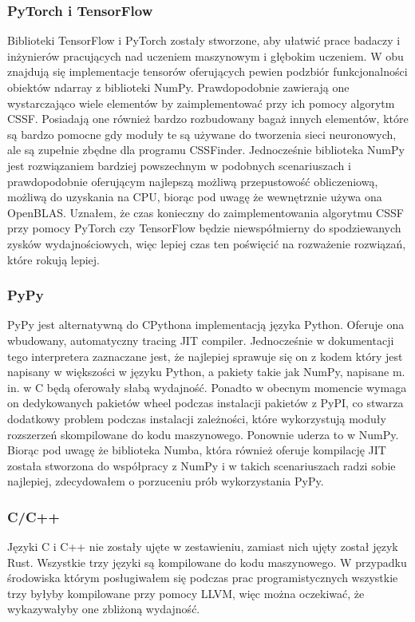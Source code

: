 \documentclass[11pt, a4paper]{article}
\begin{document}
\begin{sloppypar}
    \subsubsection{PyTorch i TensorFlow}
    Biblioteki TensorFlow i PyTorch zostały stworzone, aby ułatwić prace badaczy i inżynierów
    pracujących nad uczeniem maszynowym i głębokim uczeniem. W obu znajdują się
    implementacje tensorów oferujących pewien podzbiór funkcjonalności obiektów ndarray
    z biblioteki NumPy. Prawdopodobnie zawierają one wystarczająco wiele elementów by zaimplementować
    przy ich pomocy algorytm CSSF. Posiadają one również bardzo rozbudowany bagaż innych
    elementów, które są bardzo pomocne gdy moduły te są używane do tworzenia sieci neuronowych,
    ale są zupełnie zbędne dla programu CSSFinder. Jednocześnie biblioteka NumPy jest rozwiązaniem
    bardziej powszechnym w podobnych scenariuszach i prawdopodobnie oferującym najlepszą
    możliwą przepustowość obliczeniową, możliwą do uzyskania na CPU, biorąc pod uwagę że
    wewnętrznie używa ona OpenBLAS. Uznałem, że czas konieczny do zaimplementowania algorytmu
    CSSF przy pomocy PyTorch czy TensorFlow będzie niewspółmierny do spodziewanych zysków
    wydajnościowych, więc lepiej czas ten poświęcić na rozważenie rozwiązań, które rokują
    lepiej.

    \subsubsection{PyPy}
    PyPy jest alternatywną do CPythona implementacją języka Python. Oferuje ona
    wbudowany, automatyczny tracing JIT compiler. Jednocześnie w dokumentacji tego
    interpretera zaznaczane jest, że najlepiej sprawuje się on z kodem który jest napisany
    w większości w języku Python, a pakiety takie jak NumPy, napisane m. in. w C będą oferowały
    słabą wydajność\cite{PyPyPerformance}. Ponadto w obecnym momencie wymaga on dedykowanych
    pakietów wheel podczas instalacji pakietów z PyPI, co stwarza dodatkowy problem
    podczas instalacji zależności, które wykorzystują moduły rozszerzeń skompilowane do kodu
    maszynowego. Ponownie uderza to w NumPy. Biorąc pod uwagę że biblioteka Numba, która
    również oferuje kompilację JIT została stworzona do współpracy z NumPy i w takich
    scenariuszach radzi sobie najlepiej, zdecydowałem o porzuceniu prób wykorzystania PyPy.

    \subsubsection{C/C++}
    Języki C i C++ nie zostały ujęte w zestawieniu, zamiast nich ujęty został język Rust.
    Wszystkie trzy języki są kompilowane do kodu maszynowego. W przypadku środowiska
    którym posługiwałem się podczas prac programistycznych wszystkie trzy byłyby
    kompilowane przy pomocy LLVM, więc można oczekiwać, że wykazywałyby one zbliżoną
    wydajność.


\end{sloppypar}
\end{document}
